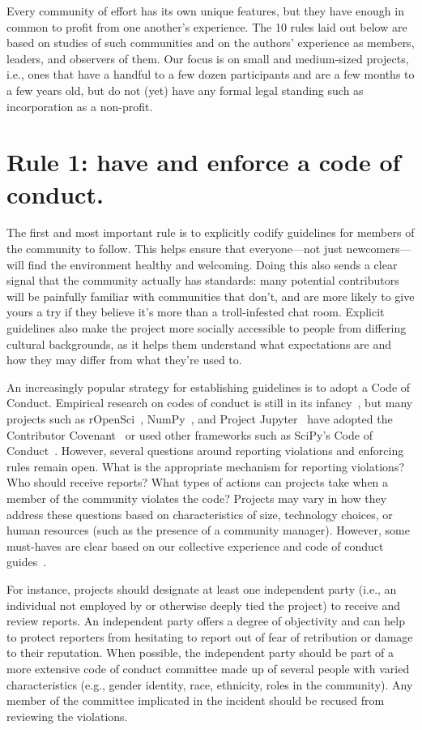 \documentclass[10pt,letterpaper]{article}
\newcommand{\rulemajor}[1]{\section*{#1}}
\begin{document}
Every community of effort has its own unique features,
but they have enough in common to profit from one another's experience.
The 10 rules laid out below are based on studies of such communities
and on the authors' experience as members,
leaders,
and observers of them.
Our focus is on small and medium-sized projects,
i.e.,
ones that have a handful to a few dozen participants
and are a few months to a few years old,
but do not (yet) have any formal legal standing
such as incorporation as a non-profit.

\rulemajor{Rule 1: have and enforce a code of conduct.}

The first and most important rule is
to explicitly codify guidelines for members of the community to follow.
This helps ensure that everyone---not just newcomers---will find the environment healthy and welcoming.
Doing this also sends a clear signal that the community actually has standards:
many potential contributors will be painfully familiar with communities that don't,
and are more likely to give yours a try if they believe
it's more than a troll-infested chat room.
Explicit guidelines also make the project more socially accessible to people from differing cultural backgrounds,
as it helps them understand what expectations are and how they may differ from what they're used to.

An increasingly popular strategy for establishing guidelines is to adopt a Code of Conduct.
Empirical research on codes of conduct is still in its infancy~\cite{tourani2017},
but many projects such as rOpenSci~\cite{ropensci-coc},
NumPy~\cite{numpy-coc},
and Project Jupyter~\cite{jupyter-coc}
have adopted the Contributor Covenant~\cite{covenant}
or used other frameworks such as SciPy's Code of Conduct~\cite{scipy-coc}.
However, several questions around reporting violations and enforcing rules remain open.
What is the appropriate mechanism for reporting violations?
Who should receive reports?
What types of actions can projects take when a member of the community violates the code?
Projects may vary in how they address these questions based on characteristics of size, technology choices, or human resources
(such as the presence of a community manager).
However, some must-haves are clear based on our collective experience and code of conduct guides~\cite{aurora2019}.

For instance,
projects should designate at least one independent party
(i.e., an individual not employed by or otherwise deeply tied the project)
to receive and review reports.
An independent party offers a degree of objectivity
and can help to protect reporters from hesitating to report out of fear of retribution or damage to their reputation.
When possible,
the independent party should be part of a more extensive code of conduct committee made up of several people with varied characteristics
(e.g., gender identity, race, ethnicity, roles in the community).
Any member of the committee implicated in the incident should be recused from reviewing the violations.
\end{document}
